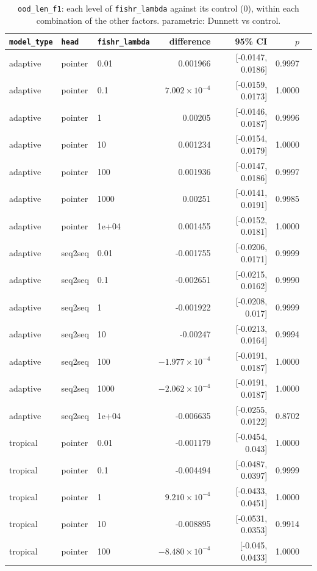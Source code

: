 \documentclass[10pt]{article}
\begin{document}
{\small
\begin{longtable}{lllrrrl}
\caption{\texttt{ood\_len\_f1}: each level of \texttt{fishr\_lambda} against its control (0), within each combination of the other factors. parametric: Dunnett vs control.}\label{tab:control-ood_len_f1}\\
\toprule
\texttt{model\_type} & \texttt{head} & \texttt{fishr\_lambda} & difference & 95\% CI & $p$ & \\
\midrule
\endhead
adaptive & pointer & 0.01 & 0.001966 & [-0.0147, 0.0186] & 0.9997 & \\
adaptive & pointer & 0.1 & $7.002\times10^{-4}$ & [-0.0159, 0.0173] & 1.0000 & \\
adaptive & pointer & 1 & 0.00205 & [-0.0146, 0.0187] & 0.9996 & \\
adaptive & pointer & 10 & 0.001234 & [-0.0154, 0.0179] & 1.0000 & \\
adaptive & pointer & 100 & 0.001936 & [-0.0147, 0.0186] & 0.9997 & \\
adaptive & pointer & 1000 & 0.00251 & [-0.0141, 0.0191] & 0.9985 & \\
adaptive & pointer & 1e+04 & 0.001455 & [-0.0152, 0.0181] & 1.0000 & \\
adaptive & seq2seq & 0.01 & -0.001755 & [-0.0206, 0.0171] & 0.9999 & \\
adaptive & seq2seq & 0.1 & -0.002651 & [-0.0215, 0.0162] & 0.9990 & \\
adaptive & seq2seq & 1 & -0.001922 & [-0.0208, 0.017] & 0.9999 & \\
adaptive & seq2seq & 10 & -0.00247 & [-0.0213, 0.0164] & 0.9994 & \\
adaptive & seq2seq & 100 & $-1.977\times10^{-4}$ & [-0.0191, 0.0187] & 1.0000 & \\
adaptive & seq2seq & 1000 & $-2.062\times10^{-4}$ & [-0.0191, 0.0187] & 1.0000 & \\
adaptive & seq2seq & 1e+04 & -0.006635 & [-0.0255, 0.0122] & 0.8702 & \\
tropical & pointer & 0.01 & -0.001179 & [-0.0454, 0.043] & 1.0000 & \\
tropical & pointer & 0.1 & -0.004494 & [-0.0487, 0.0397] & 0.9999 & \\
tropical & pointer & 1 & $9.210\times10^{-4}$ & [-0.0433, 0.0451] & 1.0000 & \\
tropical & pointer & 10 & -0.008895 & [-0.0531, 0.0353] & 0.9914 & \\
tropical & pointer & 100 & $-8.480\times10^{-4}$ & [-0.045, 0.0433] & 1.0000 & \\

\end{longtable}}
\end{document}
